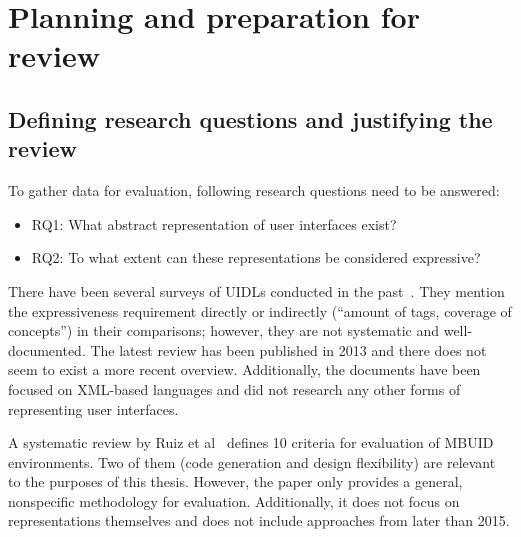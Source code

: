 \section[Planning and preparation]{Planning and preparation for review}\label{sec:planning-and-preparation-for-review}

\subsection{Defining research questions and justifying the review}\label{subsec:defining-research-questions-and-justifying-the-review}
To gather data for evaluation, following research questions need to be answered:
\begin{itemize}
    \item RQ1: What abstract representation of user interfaces exist?
    \item RQ2: To what extent can these representations be considered expressive?
\end{itemize}

There have been several surveys of UIDLs conducted in the past~\cite{Souchon2003, guerrero_garcia_theoretical_2009, guerrero_garcia_theoretical_2011, Jovanovic2013}.
They mention the expressiveness requirement directly or indirectly (\enquote{amount of tags, coverage of concepts}) in their comparisons;
however, they are not systematic and well-documented.
The latest review has been published in 2013 and there does not seem to exist a more recent overview.
Additionally, the documents have been focused on XML-based languages and did not research any other forms of representing user interfaces.

A systematic review by Ruiz et al~\cite{Ruiz2018} defines 10 criteria for evaluation of MBUID environments.
Two of them (code generation and design flexibility) are relevant to the purposes of this thesis.
However, the paper only provides a general, nonspecific methodology for evaluation.
Additionally, it does not focus on representations themselves and does not include approaches from later than 2015.

